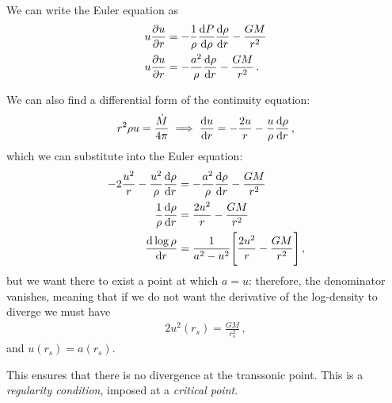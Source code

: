 \documentclass[main.tex]{subfiles}
\begin{document}
We can write the Euler equation as 
%
\begin{align}
u \pdv{u}{r} &= - \frac{1}{\rho } \dv{P}{\rho } \dv{\rho }{r} - \frac{GM}{r^2}   \\
u \pdv{u}{r} &= - \frac{a^2}{\rho } \dv{\rho }{r } - \frac{GM}{r^2}
\,.
\end{align}

We can also find a differential form of the continuity equation: 
%
\begin{align}
r^2 \rho u = \frac{\dot{M}}{4 \pi  } \implies
\dv{u}{r} = - \frac{2u}{r} - \frac{u}{\rho } \dv{\rho }{r}
\,,
\end{align}
%
which we can substitute into the Euler equation: 
%
\begin{align}
-2 \frac{u^2}{r} - \frac{u^2}{\rho } \dv{\rho }{r}
&= - \frac{a^2}{\rho } \dv{\rho }{r} - \frac{GM}{r^2}  \\
\frac{1}{\rho } \dv{\rho }{r} (a^2 - u^2) &= \frac{2u^2}{r} - \frac{GM}{r^2}  \\
\dv{\log \rho }{r} &= \frac{1}{a^2 - u^2} \qty[\frac{2u^2}{r} - \frac{GM}{r^2}]
\,,
\end{align}
%
but we want there to exist a point at which \(a = u\): therefore, the denominator vanishes, meaning that if we do not want the derivative of the log-density to diverge we must have 
%
\begin{align}
2 u^2 (r_s) = \frac{GM}{r_s^2}
\,,
\end{align}
%
and \(u (r_s) = a( r_s)\). 

This ensures that there is no divergence at the transsonic point. 
This is a \emph{regularity condition}, imposed at a \emph{critical point}.
\end{document}
